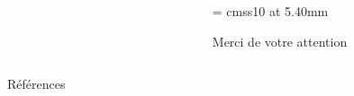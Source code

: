 \documentclass[english,xcolor=table]{beamer}
\begin{document}
\begin{frame}

  \begin{columns}
    \begin{column}{0.70\textwidth}
      \begin{center}
      \begin{figure}[ht]
    \centering
        \def\svgwidth{\columnwidth}
    
\end{figure}

      \end{center}
    \end{column}
    \begin{column}{0.30\textwidth}
      \begin{center}

        \font\endfont = cmss10 at 5.40mm
\color[rgb]{0.00,0.00,1.00}       \endfont 
        \baselineskip 7.0mm

        Merci de votre attention

      \end{center}    

    \end{column}
  \end{columns}

\end{frame}
\begin{frame}{Références}
\tiny


    

\end{frame}
\end{document}
